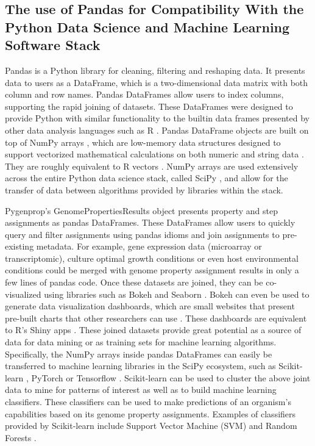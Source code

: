 \subsection{The use of Pandas for Compatibility With the Python Data Science and Machine Learning Software Stack}

Pandas is a Python library for cleaning, filtering and reshaping data. It presents data to users as a DataFrame, which is a two-dimensional data matrix with both column and row names. Pandas DataFrames allow users to index columns, supporting the rapid joining of datasets. These DataFrames were designed to provide Python with similar functionality to the builtin data frames presented by other data analysis languages such as R \cite{rprogman}. Pandas DataFrame objects are built on top of NumPy arrays \cite{mckinney2010data}, which are low-memory data structures designed to support vectorized mathematical calculations on both numeric and string data \cite{van2011numpy}. They are roughly equivalent to R vectors \cite{rprogman}. NumPy arrays are used extensively across the entire Python data science stack, called SciPy \cite{scipystack}, and allow for the transfer of data between algorithms provided by libraries within the stack.

Pygenprop's GenomePropertiesResults object presents property and step assignments as pandas DataFrames. These DataFrames allow users to quickly query and filter assignments using pandas idioms and join assignments to pre-existing metadata. For example, gene expression data (microarray or transcriptomic), culture optimal growth conditions or even host environmental conditions could be merged with genome property assignment results in only a few lines of pandas code. Once these datasets are joined, they can be co-visualized using libraries such as Bokeh \cite{bokeh} and Seaborn \cite{seaborn}. Bokeh can even be used to generate data visualization dashboards, which are small websites that present pre-built charts that other researchers can use \cite{bokeh}. These dashboards are equivalent to R's Shiny apps \cite{beeley2013web}. These joined datasets provide great potential as a source of data for data mining or as training sets for machine learning algorithms. Specifically, the NumPy arrays inside pandas DataFrames can easily be transferred to machine learning libraries in the SciPy ecosystem, such as Scikit-learn \cite{pedregosa2011scikit}, PyTorch \cite{Paszke2017} or Tensorflow \cite{abadi2016tensorflow}. Scikit-learn can be used to cluster the above joint data to mine for patterns of interest as well as to build machine learning classifiers. These classifiers can be used to make predictions of an organism's capabilities based on its genome property assignments. Examples of classifiers provided by Scikit-learn include Support Vector Machine (SVM) and Random Forests \cite{pedregosa2011scikit}.

